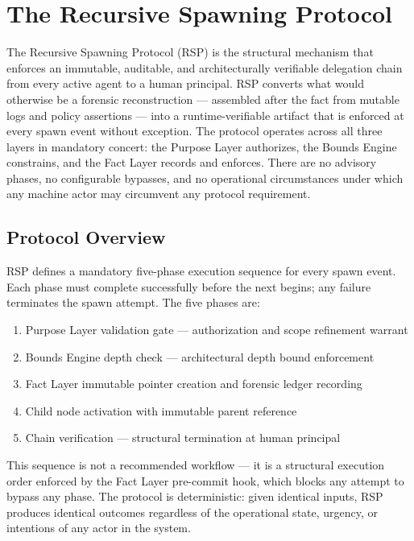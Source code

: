 \section{The Recursive Spawning Protocol}
\label{sec:rs-protocol}

The Recursive Spawning Protocol (RSP) is the structural mechanism that enforces an immutable, auditable, and architecturally verifiable delegation chain from every active agent to a human principal. RSP converts what would otherwise be a forensic reconstruction --- assembled after the fact from mutable logs and policy assertions --- into a runtime-verifiable artifact that is enforced at every spawn event without exception. The protocol operates across all three \bxthree{} layers in mandatory concert: the Purpose Layer authorizes, the Bounds Engine constrains, and the Fact Layer records and enforces. There are no advisory phases, no configurable bypasses, and no operational circumstances under which any machine actor may circumvent any protocol requirement.

\subsection{Protocol Overview}
\label{sec:rs-overview}

RSP defines a mandatory five-phase execution sequence for every spawn event. Each phase must complete successfully before the next begins; any failure terminates the spawn attempt. The five phases are:

\begin{enumerate}
    \item Purpose Layer validation gate --- authorization and scope refinement warrant
    \item Bounds Engine depth check --- architectural depth bound enforcement
    \item Fact Layer immutable pointer creation and forensic ledger recording
    \item Child node activation with immutable parent reference
    \item Chain verification --- structural termination at human principal
\end{enumerate}

This sequence is not a recommended workflow --- it is a structural execution order enforced by the Fact Layer pre-commit hook, which blocks any attempt to bypass any phase. The protocol is deterministic: given identical inputs, RSP produces identical outcomes regardless of the operational state, urgency, or intentions of any actor in the system.


